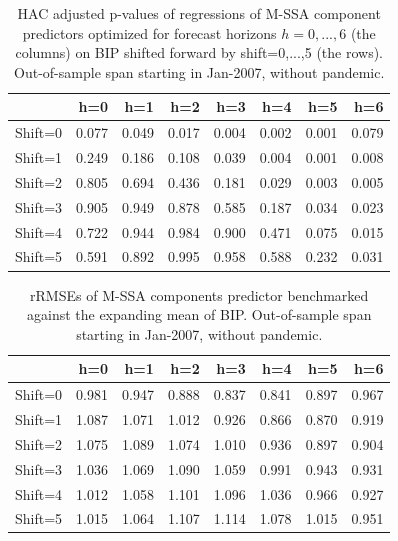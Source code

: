 \documentclass[a4paper]{article}
\begin{document}
\begin{table}[ht]
\centering
\begin{tabular}{rrrrrrrr}
  \hline
 & h=0 & h=1 & h=2 & h=3 & h=4 & h=5 & h=6 \\ 
  \hline
Shift=0 & 0.077 & 0.049 & 0.017 & 0.004 & 0.002 & 0.001 & 0.079 \\ 
  Shift=1 & 0.249 & 0.186 & 0.108 & 0.039 & 0.004 & 0.001 & 0.008 \\ 
  Shift=2 & 0.805 & 0.694 & 0.436 & 0.181 & 0.029 & 0.003 & 0.005 \\ 
  Shift=3 & 0.905 & 0.949 & 0.878 & 0.585 & 0.187 & 0.034 & 0.023 \\ 
  Shift=4 & 0.722 & 0.944 & 0.984 & 0.900 & 0.471 & 0.075 & 0.015 \\ 
  Shift=5 & 0.591 & 0.892 & 0.995 & 0.958 & 0.588 & 0.232 & 0.031 \\ 
   \hline
\end{tabular}
\caption{HAC adjusted p-values of regressions of M-SSA component predictors optimized for forecast horizons $h=0,...,6$  (the columns) on BIP shifted forward by shift=0,...,5 (the rows). Out-of-sample span starting in Jan-2007, without pandemic.} 
\label{p_val_wc5}
\end{table}%
\begin{table}[ht]
\centering
\begin{tabular}{rrrrrrrr}
  \hline
 & h=0 & h=1 & h=2 & h=3 & h=4 & h=5 & h=6 \\ 
  \hline
Shift=0 & 0.981 & 0.947 & 0.888 & 0.837 & 0.841 & 0.897 & 0.967 \\ 
  Shift=1 & 1.087 & 1.071 & 1.012 & 0.926 & 0.866 & 0.870 & 0.919 \\ 
  Shift=2 & 1.075 & 1.089 & 1.074 & 1.010 & 0.936 & 0.897 & 0.904 \\ 
  Shift=3 & 1.036 & 1.069 & 1.090 & 1.059 & 0.991 & 0.943 & 0.931 \\ 
  Shift=4 & 1.012 & 1.058 & 1.101 & 1.096 & 1.036 & 0.966 & 0.927 \\ 
  Shift=5 & 1.015 & 1.064 & 1.107 & 1.114 & 1.078 & 1.015 & 0.951 \\ 
   \hline
\end{tabular}
\caption{rRMSEs of M-SSA components predictor benchmarked against the expanding mean of BIP. Out-of-sample span starting in Jan-2007, without pandemic.} 
\label{rRMSE_mSSA_comp_mean6}
\end{table}%
\end{document}
